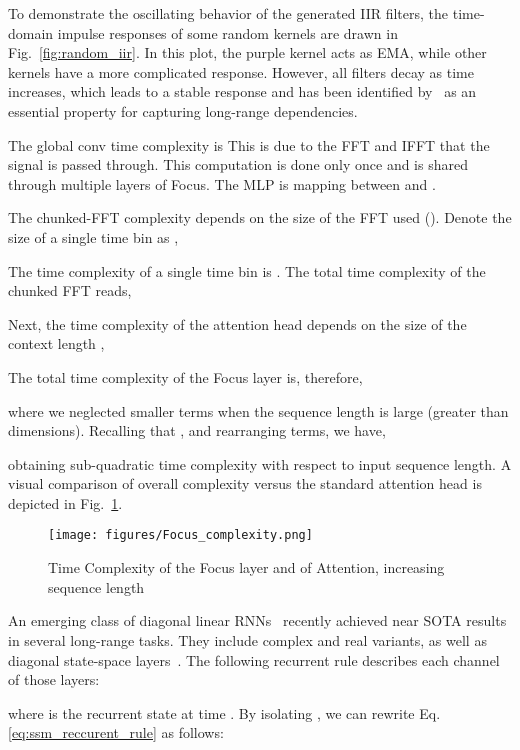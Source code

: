 \documentclass[11pt]{article}
\begin{document}
To demonstrate the oscillating behavior of the generated IIR filters, the time-domain impulse responses of some random kernels are drawn in Fig.~\ref{fig:random_iir}. In this plot, the purple kernel acts as EMA, while other kernels have a more complicated response. However, all filters decay as time increases, which leads to a stable response and has been identified by~\citet{li2022makes} as an essential property for capturing long-range dependencies.

{}
The global conv time complexity is  
This is due to the FFT and IFFT that the signal is passed through.
This computation is done only once and is shared through multiple layers of Focus. The MLP is mapping between  and .

The chunked-FFT complexity depends on the size of the FFT used (). Denote the size of a single time bin as ,

The time complexity of a single time bin is .
The total time complexity of the chunked FFT reads,

Next, the time complexity of the attention head depends on the size of the context length ,


The total time complexity of the Focus layer is, therefore, 

where we neglected smaller terms when the sequence length is large (greater than dimensions). Recalling that , and rearranging terms, we have,

obtaining sub-quadratic time complexity with respect to input sequence length.
A visual comparison of overall complexity versus the standard attention head is depicted in Fig.~\ref{fig:time_complexity}.
\begin{figure}
    \centering
    \texttt{[image: figures/Focus\_complexity.png]}
\caption{Time Complexity of the Focus layer and of Attention, increasing sequence length}
    \label{fig:time_complexity}
\end{figure}

An emerging class of diagonal linear RNNs~\cite{orvieto2023resurrecting,gupta2022simplifying} recently achieved near SOTA results in several long-range tasks. They include complex and real variants, as well as diagonal state-space layers~\cite{gupta2022diagonal,gu2022parameterization}. The following recurrent rule describes each channel of those layers:

where  is the recurrent state at time . By isolating , we can rewrite Eq. \ref{eq:ssm_reccurent_rule} as follows:
\end{document}
